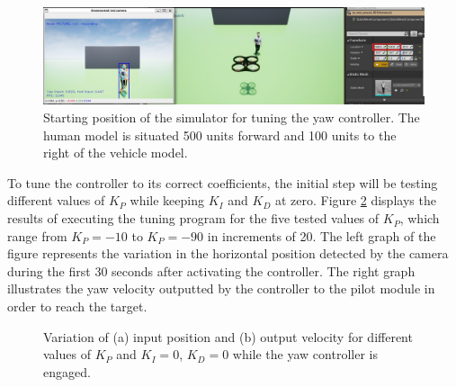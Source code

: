 \begin{figure}[H]
  \centering
  \includegraphics[width=\textwidth, keepaspectratio]{img/pid/tune-ref-pos-yaw.jpg}
  \caption{Starting position of the simulator for tuning the yaw controller. The human model is situated 500 units forward and 100 units to the right of the vehicle model.}
  \label{fig:tune-ref-pos-yaw}
\end{figure}


To tune the controller to its correct coefficients, the initial step will be testing different values of $K_{P}$ while keeping $K_{I}$ and $K_{D}$ at zero. Figure \ref{fig:tune-yaw-prop} displays the results of executing the tuning program for the five tested values of $K_{P}$, which range from $K_{P}=-10$ to $K_{P}=-90$ in increments of 20.
The left graph of the figure represents the variation in the horizontal position detected by the camera during the first 30 seconds after activating the controller. The right graph illustrates the yaw velocity outputted by the controller to the pilot module in order to reach the target.


\begin{figure}
  \centering
  \caption{Variation of (a) input position and (b) output velocity for different values of $K_{P}$ and $K_I=0$, $K_D=0$ while the yaw controller is engaged.}\label{fig:tune-yaw-prop}
\end{figure}


